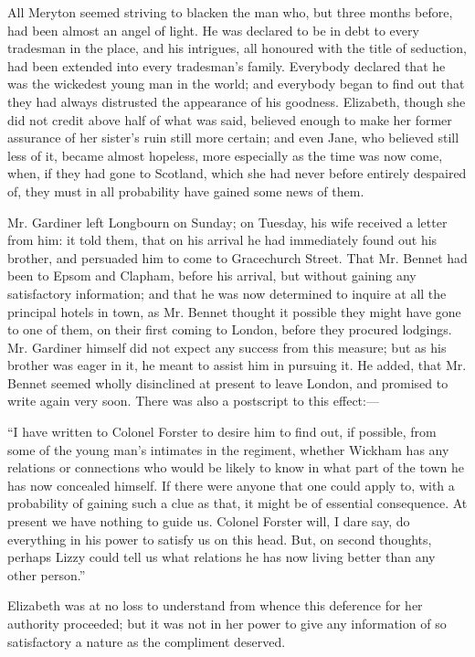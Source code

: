 All Meryton seemed striving to blacken the man who, but three months before, had been almost an angel of light. He was declared to be in debt to every tradesman in the place, and his intrigues, all honoured with the title of seduction, had been extended into every tradesman's family. Everybody declared that he was the wickedest young man in the world; and everybody began to find out that they had always distrusted the appearance of his goodness. Elizabeth, though she did not credit above half of what was said, believed enough to make her former assurance of her sister's ruin still more certain; and even Jane, who believed still less of it, became almost hopeless, more especially as the time was now come, when, if they had gone to Scotland, which she had never before entirely despaired of, they must in all probability have gained some news of them.

Mr. Gardiner left Longbourn on Sunday; on Tuesday, his wife received a letter from him: it told them, that on his arrival he had immediately found out his brother, and persuaded him to come to Gracechurch Street. That Mr. Bennet had been to Epsom and Clapham, before his arrival, but without gaining any satisfactory information; and that he was now determined to inquire at all the principal hotels in town, as Mr. Bennet thought it possible they might have gone to one of them, on their first coming to London, before they procured lodgings. Mr. Gardiner himself did not expect any success from this measure; but as his brother was eager in it, he meant to assist him in pursuing it. He added, that Mr. Bennet seemed wholly disinclined at present to leave London, and promised to write again very soon. There was also a postscript to this effect:---

``I have written to Colonel Forster to desire him to find out, if possible, from some of the young man's intimates in the regiment, whether Wickham has any relations or connections who would be likely to know in what part of the town he has now concealed himself. If there were anyone that one could apply to, with a probability of gaining such a clue as that, it might be of essential consequence. At present we have nothing to guide us. Colonel Forster will, I dare say, do everything in his power to satisfy us on this head. But, on second thoughts, perhaps Lizzy could tell us what relations he has now living better than any other person.''

Elizabeth was at no loss to understand from whence this deference for her authority proceeded; but it was not in her power to give any information of so satisfactory a nature as the compliment deserved.

